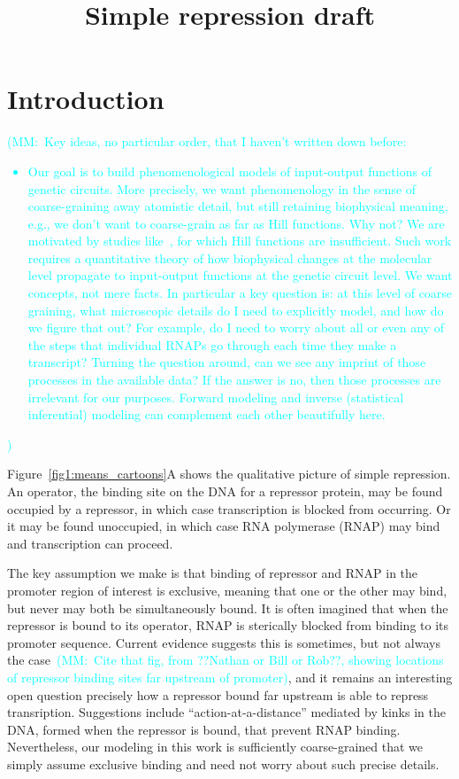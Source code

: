 \documentclass[12pt]{article}%
\newcommand{\mmnote}[1]{\textcolor{cyan}{(MM:~#1)}}
\newcommand{\fig}[1]{Figure~\ref{#1}}
\begin{document}
\title{Simple repression draft}

\maketitle

\section{Introduction}
\mmnote{Key ideas, no particular order, that I haven't written down before:
\begin{itemize}
\item Our goal is to build phenomenological models of input-output
functions of genetic circuits. More precisely, we want phenomenology
in the sense of coarse-graining away atomistic detail, but still
retaining biophysical meaning, e.g., we don't want to coarse-grain
as far as Hill functions. Why not? We are motivated by studies
like~\cite{Razo-Mejia2020}, for which Hill functions are
insufficient. Such work requires a quantitative theory of how
biophysical changes at the molecular level propagate to
input-output functions at the genetic circuit level.
We want concepts, not mere facts.
In particular a key question is: at this level of
coarse graining, what microscopic details do I need to explicitly
model, and how do we figure that out? For example, do I need to
worry about all or even any of the steps that individual RNAPs go
through each time they make a transcript? Turning the question
around, can we see any imprint of those processes in the
available data? If the answer is no, then those processes are
irrelevant for our purposes. Forward modeling and inverse
(statistical inferential) modeling can complement each other
beautifully here.
\end{itemize}}

\fig{fig1:means_cartoons}A shows the qualitative picture of
simple repression. An operator, the binding site on the DNA for a
repressor protein, may be found occupied by a repressor, in which
case transcription is blocked from occurring. Or it may be found
unoccupied, in which case RNA polymerase (RNAP) may bind and
transcription can proceed.

The key assumption we make is that binding of repressor and RNAP in the promoter region of interest is exclusive, meaning that one or the other may bind, but never may both be simultaneously bound.
It is often imagined that when the repressor is bound to its operator,
RNAP is sterically blocked from binding to its promoter sequence.
Current evidence suggests this is sometimes, but not
always the case~\mmnote{Cite that fig, from ??Nathan or Bill or
Rob??, showing locations of repressor binding sites far upstream
of promoter}, and it remains an interesting open question precisely
how a repressor bound far upstream is able to repress transription.
Suggestions include ``action-at-a-distance'' mediated by kinks in
the DNA, formed when the repressor is bound, that prevent RNAP binding.
Nevertheless, our modeling in this work is sufficiently
coarse-grained that we simply assume exclusive binding and need
not worry about such precise details.
\end{document}
